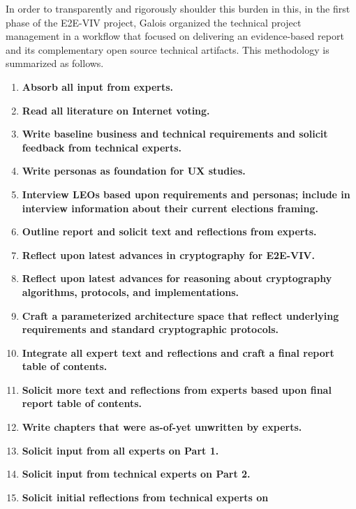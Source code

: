 In order to transparently and rigorously shoulder this burden in this,
in the first phase of the E2E-VIV project, Galois organized the
technical project management in a workflow that focused on delivering
an evidence-based report and its complementary open source technical
artifacts.  This methodology is summarized as follows.
\begin{enumerate}
\item \textbf{Absorb all input from experts.}
\item \textbf{Read all literature on Internet voting.}
\item \textbf{Write baseline business and technical requirements and
    solicit feedback from technical experts.}
\item \textbf{Write personas as foundation for UX studies.}
\item \textbf{Interview LEOs based upon requirements and personas;
    include in interview information about their current elections
    framing.}
\item \textbf{Outline report and solicit text and reflections from
    experts.}
\item \textbf{Reflect upon latest advances in cryptography for E2E-VIV.}
\item \textbf{Reflect upon latest advances for reasoning about
    cryptography algorithms, protocols, and implementations.}
\item \textbf{Craft a parameterized architecture space that reflect
    underlying requirements and standard cryptographic protocols.}
\item \textbf{Integrate all expert text and reflections and craft a
    final report table of contents.}
\item \textbf{Solicit more text and reflections from experts based
    upon final report table of contents.}
\item \textbf{Write chapters that were as-of-yet unwritten by experts.}
\item \textbf{Solicit input from all experts on Part 1.}
\item \textbf{Solicit input from technical experts on Part 2.}
\item \textbf{Solicit initial reflections from technical experts on
}
\end{enumerate}
